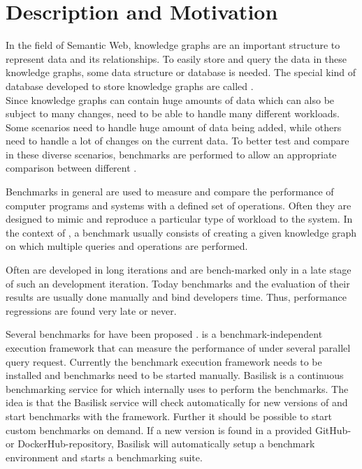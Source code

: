 \chapter{Description and Motivation}
\label{ch:description}

In the field of Semantic Web, knowledge graphs are an important structure to represent data and its relationships.
To easily store and query the data in these knowledge graphs, some data structure or database is needed.
The special kind of database developed to store knowledge graphs are called \tsp{}. \\

Since knowledge graphs can contain huge amounts of data which can also be subject to many changes, \tsp{} need to be able to handle many different workloads.
Some scenarios need to handle huge amount of data being added, while others need to handle a lot of changes on the current data.
To better test and compare \tsp{} in these diverse scenarios, benchmarks are performed to allow an appropriate comparison between different \tsp{}\cite{Representative_Benchmark}.

Benchmarks in general are used to measure and compare the performance of computer programs and systems with a defined set of operations.
Often they are designed to mimic and reproduce a particular type of workload to the system.
In the context of \tsp{}, a benchmark usually consists of creating a given knowledge graph on which multiple queries and operations are performed.

Often \tsp{} are developed in long iterations and are bench-marked only in a late stage of such an development iteration.
Today benchmarks and the evaluation of their results are usually done manually and bind developers time.
Thus, performance regressions are  found very late or never.


Several benchmarks for \tsp{} have been proposed \cite{Representative_Benchmark}.
\iguana{} is a benchmark-independent execution framework \cite{IGUANA} that can measure the performance of \tsp{} under several parallel query request.
Currently the benchmark execution framework needs to be installed and benchmarks need to be started manually.
Basilisk is a continuous benchmarking service for \tsp{} which internally uses \iguana{} to perform the benchmarks.
The idea is that the Basilisk service will check automatically for new versions of \tsp{} and start benchmarks with the \iguana{} framework.
Further it should be possible to start custom benchmarks on demand.
If a new version is found in a provided GitHub- or DockerHub-repository, Basilisk will automatically setup a benchmark environment and starts a benchmarking suite.

